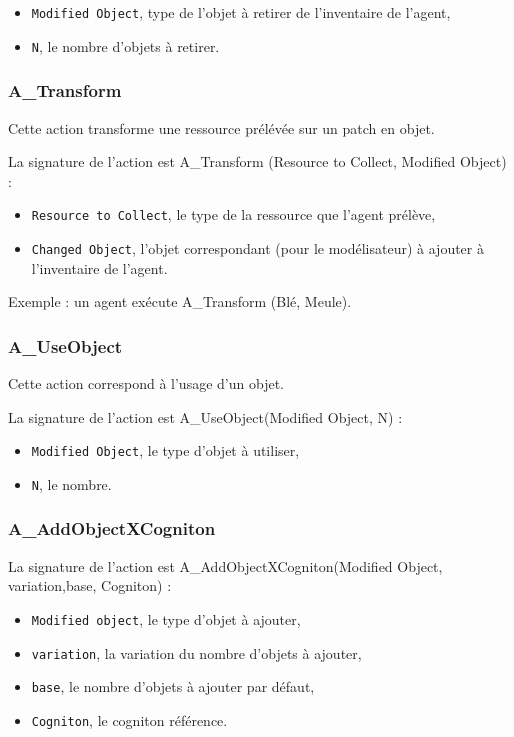 	\begin{itemize}
	\item \texttt{Modified Object}, type de l'objet à retirer de l'inventaire de l'agent,
	\item \texttt{N}, le nombre d'objets à retirer.
	\end{itemize}
	
\subsubsection{A\_Transform} 

Cette action transforme une ressource prélévée sur un patch en objet.

La signature de l'action est A\_Transform (Resource to Collect, Modified Object) :

	
	\begin{itemize}
	\item \texttt{Resource to Collect}, le type de la ressource que l'agent prélève,
	\item \texttt{Changed Object}, l'objet correspondant (pour le modélisateur) à ajouter à l'inventaire de l'agent.
	\end{itemize}
	
Exemple : un agent exécute 	 A\_Transform (Blé, Meule).

\subsubsection{A\_UseObject}
Cette action correspond à l'usage d'un objet. 


La signature de l'action est A\_UseObject(Modified Object, N) :
	\begin{itemize}
	\item \texttt{Modified Object}, le type d'objet à utiliser,
	\item \texttt{N}, le nombre.
	\end{itemize}
	
		
\subsubsection{A\_AddObjectXCogniton}

La signature de l'action est A\_AddObjectXCogniton(Modified Object, variation,base, Cogniton) :
\begin{itemize}
	\item \texttt{Modified object}, le type d'objet à ajouter,
	\item \texttt{variation}, la variation du nombre d'objets à ajouter,
	\item \texttt{base}, le nombre d'objets à ajouter par défaut,
	\item \texttt{Cogniton}, le cogniton référence.
	\end{itemize}
	
